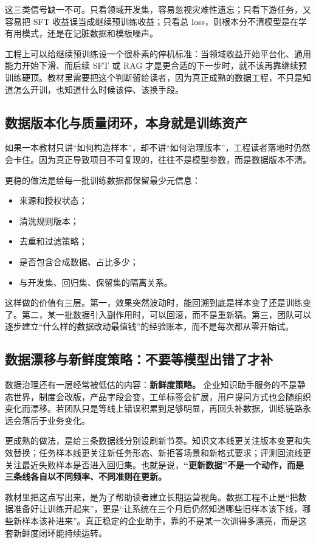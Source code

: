 这三类信号缺一不可。只看领域开发集，容易忽视灾难性遗忘；只看下游任务，又容易把 SFT 收益误当成继续预训练收益；只看总 loss，则根本分不清模型是在学有用模式，还是在记脏数据和模板噪声。

工程上可以给继续预训练设一个很朴素的停机标准：当领域收益开始平台化、通用能力开始下滑、而后续 SFT 或 RAG 才是更合适的下一步时，就不该再靠继续预训练硬顶。教材里需要把这个判断留给读者，因为真正成熟的数据工程，不只是知道怎么开训，也知道什么时候该停、该换手段。

\subsection{数据版本化与质量闭环，本身就是训练资产}
如果一本教材只讲“如何构造样本”，却不讲“如何治理版本”，工程读者落地时仍然会卡住。因为真正导致项目不可复现的，往往不是模型参数，而是数据版本不清。

更稳的做法是给每一批训练数据都保留最少元信息：
\begin{itemize}
  \item 来源和授权状态；
  \item 清洗规则版本；
  \item 去重和过滤策略；
  \item 是否包含合成数据、占比多少；
  \item 与开发集、回归集、保留集的隔离关系。
\end{itemize}

这样做的价值有三层。第一，效果突然波动时，能回溯到底是样本变了还是训练变了。第二，某一批数据引入副作用时，可以回滚，而不是重新猜。第三，团队可以逐步建立“什么样的数据改动最值钱”的经验账本，而不是每次都从零开始试。

\subsection{数据漂移与新鲜度策略：不要等模型出错了才补}
数据治理还有一层经常被低估的内容：\textbf{新鲜度策略。} 企业知识助手服务的不是静态世界，制度会改版，产品字段会变，工单标签会扩展，用户提问方式也会随组织变化而漂移。若团队只是等线上错误积累到足够明显，再回头补数据，训练链路永远会落后于业务变化。

更成熟的做法，是给三条数据线分别设刷新节奏。知识文本线更关注版本变更和失效替换；任务样本线更关注新任务形态、新拒答场景和新格式要求；评测回流线更关注最近失败样本是否进入回归集。也就是说，\textbf{“更新数据”不是一个动作，而是三条线各自以不同频率、不同准则在更新。}

教材里把这点写出来，是为了帮助读者建立长期运营视角。数据工程不止是“把数据准备好让训练开起来”，更是“让系统在三个月后仍然知道哪些旧样本该下线，哪些新样本该补进来”。真正稳定的企业助手，靠的不是某一次训得多漂亮，而是这套新鲜度闭环能持续运转。

